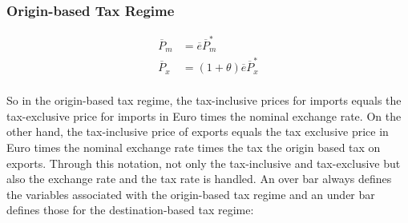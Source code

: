 
\subsubsection*{Origin-based Tax Regime}

\begin{equation}\label{O.Tax}
\begin{aligned}
    \overline P_m &= \overline e\overline P^*_m \\
    \overline P_x &= \left( 1+\theta \right) \overline e\overline P^*_x \\
\end{aligned}
\end{equation}

\noindent So in the origin-based tax regime, the tax-inclusive prices for imports equals the tax-exclusive price for imports in Euro times the nominal exchange rate. On the other hand, the tax-inclusive price of exports equals the tax exclusive price in Euro times the nominal exchange rate times the tax the origin based tax on exports. Through this notation, not only the tax-inclusive and tax-exclusive but also the exchange rate and the tax rate is handled. An over bar always defines the variables associated with the origin-based tax regime and an under bar defines those for the destination-based tax regime:

